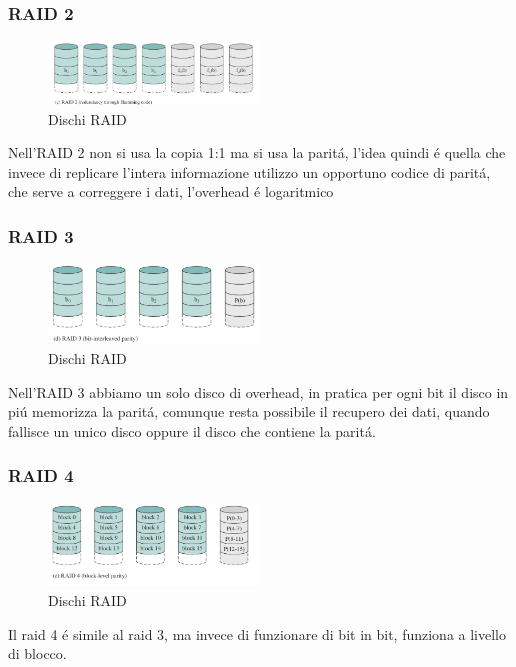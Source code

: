 \subsubsection*{RAID 2}
\begin{figure}[H]
    \centering
    \includegraphics[width=0.5\textwidth]{immagini/RAID2}
    \caption{Dischi RAID}
\end{figure}
Nell'RAID 2 non si usa la copia 1:1  ma si usa la paritá, l'idea quindi é quella che invece di replicare l'intera informazione
utilizzo un opportuno codice di paritá, che serve a correggere i dati, l'overhead é logaritmico
\subsubsection*{RAID 3}
\begin{figure}[H]
    \centering
    \includegraphics[width=0.5\textwidth]{immagini/RAID3}
    \caption{Dischi RAID}
\end{figure}
Nell'RAID 3 abbiamo un solo disco di overhead, in pratica per ogni bit il disco in piú memorizza la paritá,
comunque resta possibile il recupero dei dati, quando fallisce un unico disco oppure il disco che contiene la paritá.
\subsubsection*{RAID 4}
\begin{figure}[H]
    \centering
    \includegraphics[width=0.5\textwidth]{immagini/RAID4}
    \caption{Dischi RAID}
\end{figure}
Il raid 4 é simile al raid 3, ma invece di funzionare di bit in bit, funziona a livello di blocco.
